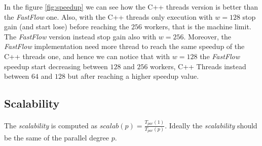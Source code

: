 \bigskip\noindent
In the figure \ref{fig:speedup} we can see how the C++ threads version is better than the \textit{FastFlow} one. Also, with the C++ threads only execution with $w = 128$ stop gain (and start lose) before reaching the $256$ workers, that is the machine limit. The \textit{FastFlow} version instead stop gain also with $w = 256$. Moreover, the \textit{FastFlow} implementation need more thread to reach the same speedup of the C++ threads one, and hence we can notice that with $w = 128$ the \textit{FastFlow} speedup start decreasing between $128$ and $256$ workers, C++ Threads instead between $64$ and $128$ but after reaching a higher speedup value.



\subsection{Scalability}
The \textit{scalability} is computed as $scalab(p) = \frac{T_{par}(1)}{T_{par}(p)}$. Ideally the \textit{scalability} should be the same of the parallel degree $p$.

